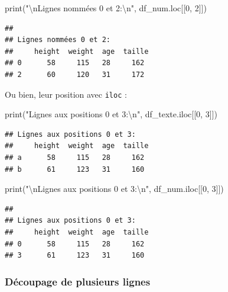 \documentclass[
  12pt,
]{book}
\newenvironment{Shaded}{\begin{snugshade}}{\end{snugshade}}
\newcommand{\BuiltInTok}[1]{#1}
\newcommand{\CharTok}[1]{\textcolor[rgb]{0.31,0.60,0.02}{#1}}
\newcommand{\DecValTok}[1]{\textcolor[rgb]{0.00,0.00,0.81}{#1}}
\newcommand{\NormalTok}[1]{#1}
\newcommand{\StringTok}[1]{\textcolor[rgb]{0.31,0.60,0.02}{#1}}
\numberwithin{equation}{section}
\numberwithin{countremarque}{section}
\begin{document}
\begin{Shaded}
\begin{Highlighting}[]
\BuiltInTok{print}\NormalTok{(}\StringTok{"}\CharTok{\textbackslash{}n}\StringTok{Lignes nommées 0 et 2:}\CharTok{\textbackslash{}n}\StringTok{"}\NormalTok{, df\_num.loc[[}\DecValTok{0}\NormalTok{, }\DecValTok{2}\NormalTok{]])}
\end{Highlighting}
\end{Shaded}

\begin{lstlisting}
## 
## Lignes nommées 0 et 2:
##     height  weight  age  taille
## 0      58     115   28     162
## 2      60     120   31     172
\end{lstlisting}

Ou bien, leur position avec \texttt{iloc} :

\begin{Shaded}
\begin{Highlighting}[]
\BuiltInTok{print}\NormalTok{(}\StringTok{"Lignes aux positions 0 et 3:}\CharTok{\textbackslash{}n}\StringTok{"}\NormalTok{, df\_texte.iloc[[}\DecValTok{0}\NormalTok{, }\DecValTok{3}\NormalTok{]])}
\end{Highlighting}
\end{Shaded}

\begin{lstlisting}
## Lignes aux positions 0 et 3:
##     height  weight  age  taille
## a      58     115   28     162
## b      61     123   31     160
\end{lstlisting}

\begin{Shaded}
\begin{Highlighting}[]
\BuiltInTok{print}\NormalTok{(}\StringTok{"}\CharTok{\textbackslash{}n}\StringTok{Lignes aux positions 0 et 3:}\CharTok{\textbackslash{}n}\StringTok{"}\NormalTok{, df\_num.iloc[[}\DecValTok{0}\NormalTok{, }\DecValTok{3}\NormalTok{]])}
\end{Highlighting}
\end{Shaded}

\begin{lstlisting}
## 
## Lignes aux positions 0 et 3:
##     height  weight  age  taille
## 0      58     115   28     162
## 3      61     123   31     160
\end{lstlisting}

\subsubsection{Découpage de plusieurs lignes}\label{decoupage-df-lignes}
\end{document}
